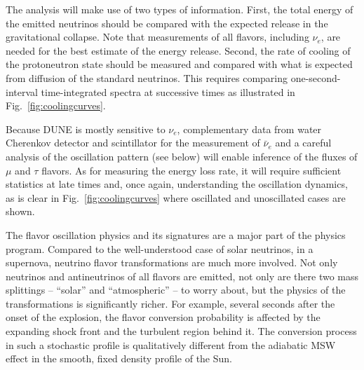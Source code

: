 The analysis will make use of two types of information. First, the total energy of the emitted neutrinos should be compared with the expected release in the gravitational collapse.  Note that measurements of all flavors, including $\nu_e$, are needed for the best estimate of the energy release.
Second, the rate of cooling of the protoneutron state should be measured and compared with what is expected from diffusion of the standard neutrinos. This requires comparing one-second-interval time-integrated spectra at successive times as illustrated in Fig.~\ref{fig:coolingcurves}. 

Because DUNE is mostly sensitive to $\nu_e$, complementary data from water Cherenkov detector and scintillator for the measurement of $\bar\nu_{e}$ and a careful analysis of the oscillation pattern (see below) will enable inference of the fluxes of $\mu$ and $\tau$ flavors. As for measuring the energy loss rate, it will require sufficient statistics at late times and, once again, understanding the oscillation dynamics, as is clear in Fig.~\ref{fig:coolingcurves} where oscillated and unoscillated cases are shown.

The flavor oscillation physics and its signatures are a major part of the physics program. Compared to the well-understood case of solar neutrinos, in a supernova, neutrino flavor transformations are much more involved. Not only neutrinos and antineutrinos of all flavors are emitted, not only are there two mass splittings -- ``solar'' and ``atmospheric'' -- to worry about, but the physics of the transformations is significantly richer. For example, several seconds after the onset of the explosion, the flavor conversion probability is affected by the expanding shock front and the turbulent region behind it. The conversion process in such a stochastic profile is qualitatively different from the adiabatic MSW effect in the smooth, fixed density profile of the Sun. 

